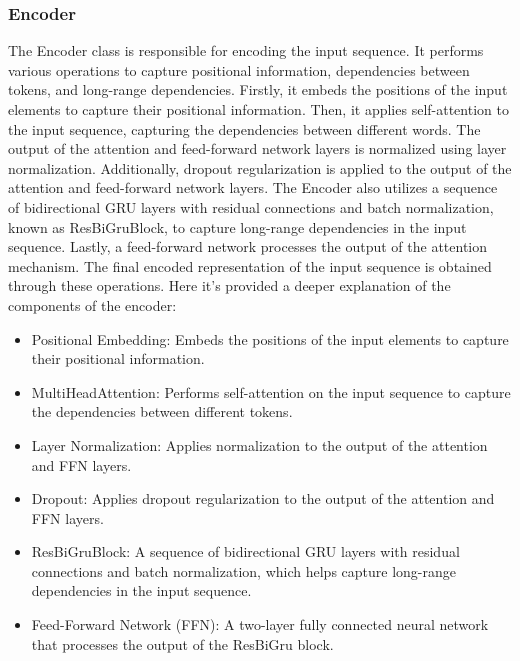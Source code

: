 \documentclass[a4paper, noexaminfo]{sapthesis}
\begin{document}
\subsubsection{Encoder}
The Encoder class is responsible for encoding the input sequence. It 
performs various operations to capture positional information, 
dependencies between tokens, and long-range dependencies. Firstly, 
it embeds the positions of the input elements to capture their positional 
information. Then, it applies self-attention to the input sequence, 
capturing the dependencies between different words. The output of the 
attention and feed-forward network layers is normalized using layer 
normalization. Additionally, dropout regularization is applied to the 
output of the attention and feed-forward network layers. The Encoder 
also utilizes a sequence of bidirectional GRU layers with residual 
connections and batch normalization, known as ResBiGruBlock, to capture 
long-range dependencies in the input sequence. Lastly, a feed-forward 
network processes the output of the attention mechanism. The final 
encoded representation of the input sequence is obtained through 
these operations.
Here it's provided a deeper explanation of the components of the encoder:
\begin{itemize}
\item Positional Embedding: Embeds the positions of the input elements to 
capture their positional information.
\item MultiHeadAttention: Performs self-attention on the input sequence 
to capture the dependencies between different tokens.
\item Layer Normalization: Applies normalization to the output of the 
attention and FFN layers.
\item Dropout: Applies dropout regularization to the output of the 
attention and FFN layers.
\item  ResBiGruBlock: A sequence of bidirectional GRU layers with 
residual connections and batch normalization, which helps capture long-range dependencies in the input sequence.
\item Feed-Forward Network (FFN): A two-layer fully connected neural 
network that processes the output of the ResBiGru block.
\end{itemize}
\end{document}

